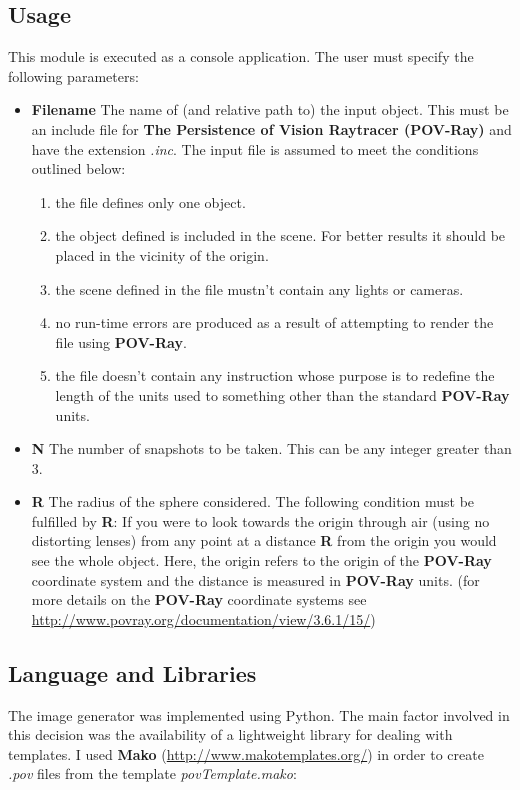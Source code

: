 \documentclass[12pt,a4paper,twoside,openright]{report}
\begin{document}
\subsection{Usage}
This module is executed as a console application. The user must specify the following parameters:
\begin{itemize}
\item \textbf{Filename} The name of (and relative path to) the input object. This must be an include file for \textbf{The Persistence of Vision Raytracer (POV-Ray)} and have the extension \textit{.inc}. The input file is assumed to meet the conditions outlined below:
	\begin{enumerate}
		\item the file defines only one object.
		\item the object defined is included in the scene. For better results it should be placed in the vicinity of the origin.
		\item the scene defined in the file mustn't contain any lights or cameras.
		\item no run-time errors are produced as a result of attempting to render the file using \textbf{POV-Ray}. 
		\item the file doesn't contain any instruction whose purpose is to redefine the length of the units used to something other than the standard \textbf{POV-Ray} units. 
	\end{enumerate}    
\item \textbf{N} The number of snapshots to be taken. This can be any integer greater than 3.
\item \textbf{R} The radius of the sphere considered. The following condition must be fulfilled by \textbf{R}: If you were to look towards the origin through air (using no distorting lenses) from any point at a distance \textbf{R} from the origin you would see the whole object. Here, the origin refers to the origin of the \textbf{POV-Ray} coordinate system and the distance is measured in \textbf{POV-Ray} units.  (for more details on the \textbf{POV-Ray} coordinate systems see \url{http://www.povray.org/documentation/view/3.6.1/15/})
\end{itemize}


\subsection{Language and Libraries}
The image generator was implemented using Python. The main factor involved in this decision was the availability of a lightweight library for dealing with templates. I used \textbf{Mako} (\url{http://www.makotemplates.org/}) in order to create \textit{.pov} files from the template \textit{povTemplate.mako}: 
\end{document}
